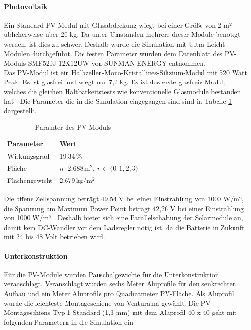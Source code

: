\paragraph{Photovoltaik}
Ein Standard-PV-Modul mit Glasabdeckung wiegt bei einer Größe von 2 m² üblicherweise über 20 kg. Da unter Umständen mehrere dieser Module benötigt werden, ist dies zu schwer. Deshalb wurde die Simulation mit Ultra-Leicht-Modulen durchgeführt.
Die festen Parameter wurden dem Datenblatt des PV-Moduls SMF520J-12X12UW von SUNMAN-ENERGY \cite{Sunman-PVmodule} entnommen. \\

Das PV-Modul ist ein Halbzellen-Mono-Kristallines-Silizium-Modul mit 520 Watt Peak. Es ist glasfrei und wiegt nur 7,2 kg. Es ist das erste glasfreie Modul, welches die gleichen Haltbarkeitstests wie konventionelle Glasmodule bestanden hat \cite{Sunman-PVmodule}. Die Parameter die in die Simulation eingegangen sind sind in Tabelle \ref{tab:pvparam} dargestellt. 

\begin{table}[h]
\centering
\begin{tabular}{|l|l|}
\hline
\textbf{Parameter} & \textbf{Wert} \\ \hline
Wirkungsgrad & 19.34\,\% \\ \hline
Fläche & $n \cdot 2.688\,\mathrm{m^2}$, \quad $n \in \{0,1,2,3\}$ \\ \hline
Flächengewicht & 2.679\,kg/m$^2$ \\ \hline
\end{tabular}
\caption{Paramter des PV-Moduls \cite{Sunman-PVmodule}}
\label{tab:pvparam}
\end{table}

Die offene Zellspannung beträgt 49,54 V bei einer Einstrahlung von 1000 W/m², die Spannung am Maximum Power Point beträgt 42,26 V bei einer Einstrahlung von 1000 W/m² \cite{Sunman-PVmodule}.  Deshalb bietet sich eine Parallelschaltung der Solarmodule an, damit kein DC-Wandler vor dem Laderegler nötig ist, da die Batterie in Zukunft mit 24 bis 48 Volt betrieben wird. 

\paragraph{Unterkonstruktion}
Für die PV-Module wurden Pauschalgewichte für die Unterkonstruktion veranschlagt. Veranschlagt wurden sechs Meter Aluprofile für den senkrechten Aufbau und ein Meter Aluprofile pro Quadratmeter PV-Fläche. Als Aluprofil wurde die leichteste Montageschiene von Venturama gewählt. Die PV-Montageschiene Typ 1 Standard (1,3 mm) mit dem Aluprofil 40 x 40 geht mit folgenden Parametern in die Simulation ein: 

